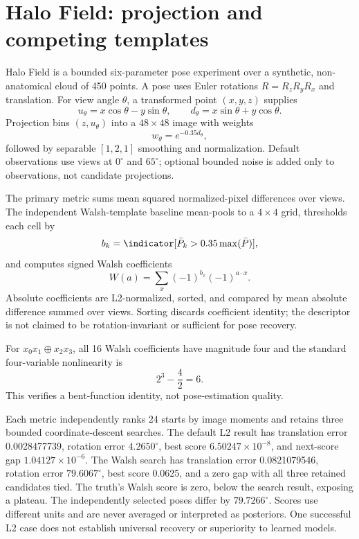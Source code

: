 \section{Halo Field: projection and competing templates}
Halo Field is a bounded six-parameter pose experiment over a synthetic, non-anatomical cloud of 450 points. A pose uses Euler rotations $R=R_zR_yR_x$ and translation. For view angle $\theta$, a transformed point $(x,y,z)$ supplies
\begin{equation}
u_\theta=x\cos\theta-y\sin\theta,\qquad
d_\theta=x\sin\theta+y\cos\theta.
\end{equation}
Projection bins $(z,u_\theta)$ into a $48\times48$ image with weights
\begin{equation}
w_\theta=e^{-0.35d_\theta},
\end{equation}
followed by separable $[1,2,1]$ smoothing and normalization. Default observations use views at $0^\circ$ and $65^\circ$; optional bounded noise is added only to observations, not candidate projections.

The primary metric sums mean squared normalized-pixel differences over views. The independent Walsh-template baseline mean-pools to a $4\times4$ grid, thresholds each cell by
\begin{equation}
b_k=\indicator[\bar P_k>0.35\max(\bar P)],
\end{equation}
and computes signed Walsh coefficients
\begin{equation}
W(a)=\sum_x(-1)^{b_x}(-1)^{a\cdot x}.
\end{equation}
Absolute coefficients are L2-normalized, sorted, and compared by mean absolute difference summed over views. Sorting discards coefficient identity; the descriptor is not claimed to be rotation-invariant or sufficient for pose recovery.

For $x_0x_1\oplus x_2x_3$, all 16 Walsh coefficients have magnitude four and the standard four-variable nonlinearity is
\begin{equation}
2^3-\frac{4}{2}=6.
\end{equation}
This verifies a bent-function identity, not pose-estimation quality.

Each metric independently ranks 24 starts by image moments and retains three bounded coordinate-descent searches. The default L2 result has translation error 0.0028477739, rotation error $4.2650^\circ$, best score $6.50247\times10^{-8}$, and next-score gap $1.04127\times10^{-6}$. The Walsh search has translation error 0.0821079546, rotation error $79.6067^\circ$, best score 0.0625, and a zero gap with all three retained candidates tied. The truth's Walsh score is zero, below the search result, exposing a plateau. The independently selected poses differ by $79.7266^\circ$. Scores use different units and are never averaged or interpreted as posteriors. One successful L2 case does not establish universal recovery or superiority to learned models.


